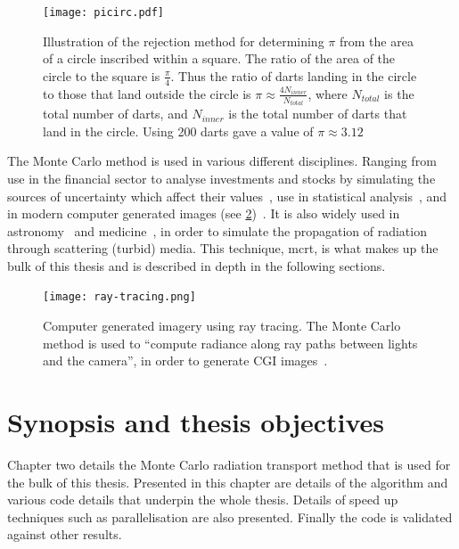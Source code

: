 \begin{figure}[!ht]
    \centering
    \texttt{[image: picirc.pdf]}
    \caption{Illustration of the rejection method for determining $\pi$ from the area of a circle inscribed within a square. The ratio of the area of the circle to the square is $\tfrac{\pi}{4}$. Thus the ratio of darts landing in the circle to those that land outside the circle is $\pi \approx \tfrac{4N_{inner}}{N_{total}}$, where $N_{total}$ is the total number of darts, and $N_{inner}$ is the total number of darts that land in the circle. Using 200 darts gave a value of $\pi \approx 3.12$}
    \label{fig:picircle}
\end{figure}


The Monte Carlo method is used in various different disciplines. Ranging from use in the financial sector to analyse investments and stocks by simulating the sources of uncertainty which affect their values~\cite{jackel2002monte,finaceprrof}, use in statistical analysis~\cite{wall2012practical}, and in modern computer generated images (see \cref{fig:ray-trace})~\cite{Kajiyarendering,Cookraytracing}. It is also widely used in astronomy~\cite{robitaille2011hyperion,harries2014torus} and medicine~\cite{valentine2011monte,campbell2015monte}, in order to simulate the propagation of radiation through scattering (turbid) media. This technique, \gls*{mcrt}, is what makes up the bulk of this thesis and is described in depth in the following sections.

\begin{figure}[!htb]
\centering
\texttt{[image: ray-tracing.png]}
\caption{Computer generated imagery using ray tracing. The Monte Carlo method is used to ``compute radiance along ray paths between lights and the camera'', in order to generate CGI images~\cite{pharr2016physically}.}
\label{fig:ray-trace}
\end{figure}


\section{Synopsis and thesis objectives}

Chapter two details the Monte Carlo radiation transport method that is used for the bulk of this thesis.
Presented in this chapter are details of the algorithm and various code details that underpin the whole thesis.
Details of speed up techniques such as parallelisation are also presented.
Finally the code is validated against other results.\\


